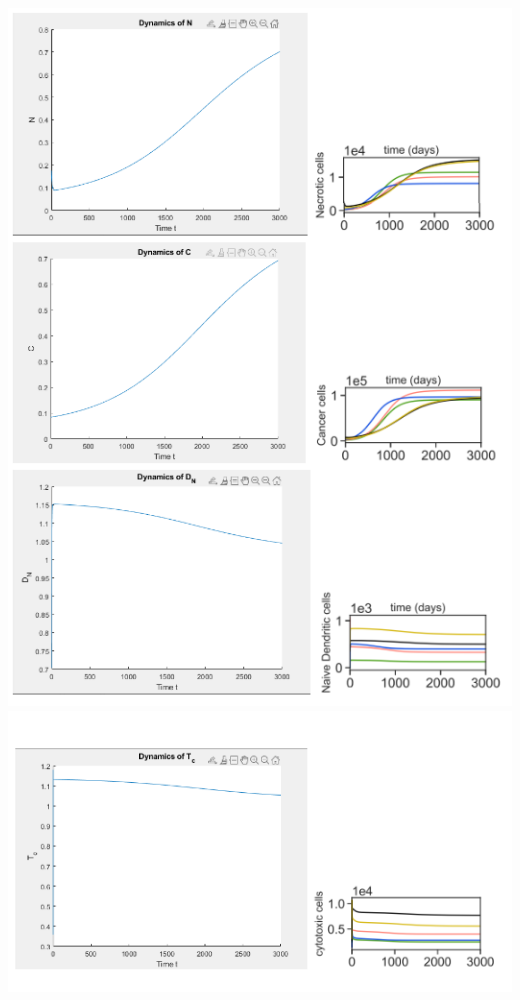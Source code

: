 \documentclass{article}
\begin{document}
\includegraphics[]{comp3.PNG}\\
\includegraphics[]{comp4.PNG}\\
\end{document}
